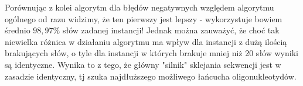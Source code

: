 \documentclass[a4paper,10pt]{article}
\begin{document}
Porównując z kolei algorytm dla błędów negatywnych względem algorytmu ogólnego od razu widzimy, że ten pierwszy jest lepszy - wykorzystuje bowiem średnio $98,97\%$ słów zadanej instancji! Jednak można zauważyć, że choć tak niewielka różnica w działaniu algorytmu ma wpływ dla instancji z dużą ilością brakujących słów, o tyle dla instancji w których brakuje mniej niż 20 słów wyniki są identyczne. Wynika to z tego, że główny "silnik" sklejania sekwencji jest w zasadzie identyczny, tj szuka najdłuższego możliwego łańcucha oligonukleotydów.
\end{document}
